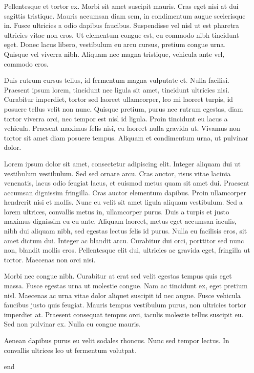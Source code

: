 Pellentesque et tortor ex. Morbi sit amet suscipit mauris. Cras eget nisi at dui sagittis tristique. Mauris accumsan diam sem, in condimentum augue scelerisque in. Fusce ultricies a odio dapibus faucibus. Suspendisse vel nisl ut est pharetra ultricies vitae non eros. Ut elementum congue est, eu commodo nibh tincidunt eget. Donec lacus libero, vestibulum eu arcu cursus, pretium congue urna. Quisque vel viverra nibh. Aliquam nec magna tristique, vehicula ante vel, commodo eros.

Duis rutrum cursus tellus, id fermentum magna vulputate et. Nulla facilisi. Praesent ipsum lorem, tincidunt nec ligula sit amet, tincidunt ultricies nisi. Curabitur imperdiet, tortor sed laoreet ullamcorper, leo mi laoreet turpis, id posuere tellus velit non nunc. Quisque pretium, purus nec rutrum egestas, diam tortor viverra orci, nec tempor est nisl id ligula. Proin tincidunt eu lacus a vehicula. Praesent maximus felis nisi, eu laoreet nulla gravida ut. Vivamus non tortor sit amet diam posuere tempus. Aliquam et condimentum urna, ut pulvinar dolor.

Lorem ipsum dolor sit amet, consectetur adipiscing elit. Integer aliquam dui ut vestibulum vestibulum. Sed sed ornare arcu. Cras auctor, risus vitae lacinia venenatis, lacus odio feugiat lacus, et euismod metus quam sit amet dui. Praesent accumsan dignissim fringilla. Cras auctor elementum dapibus. Proin ullamcorper hendrerit nisi et mollis. Nunc eu velit sit amet ligula aliquam vestibulum. Sed a lorem ultrices, convallis metus in, ullamcorper purus. Duis a turpis et justo maximus dignissim eu eu ante. Aliquam laoreet, metus eget accumsan iaculis, nibh dui aliquam nibh, sed egestas lectus felis id purus. Nulla eu facilisis eros, sit amet dictum dui. Integer ac blandit arcu. Curabitur dui orci, porttitor sed nunc non, blandit mollis eros. Pellentesque elit dui, ultricies ac gravida eget, fringilla ut tortor. Maecenas non orci nisi.

Morbi nec congue nibh. Curabitur at erat sed velit egestas tempus quis eget massa. Fusce egestas urna ut molestie congue. Nam ac tincidunt ex, eget pretium nisl. Maecenas ac urna vitae dolor aliquet suscipit id nec augue. Fusce vehicula faucibus justo quis feugiat. Mauris tempus vestibulum purus, non ultricies tortor imperdiet at. Praesent consequat tempus orci, iaculis molestie tellus suscipit eu. Sed non pulvinar ex. Nulla eu congue mauris.

Aenean dapibus purus eu velit sodales rhoncus. Nunc sed tempor lectus. In convallis ultrices leo ut fermentum volutpat.

end
